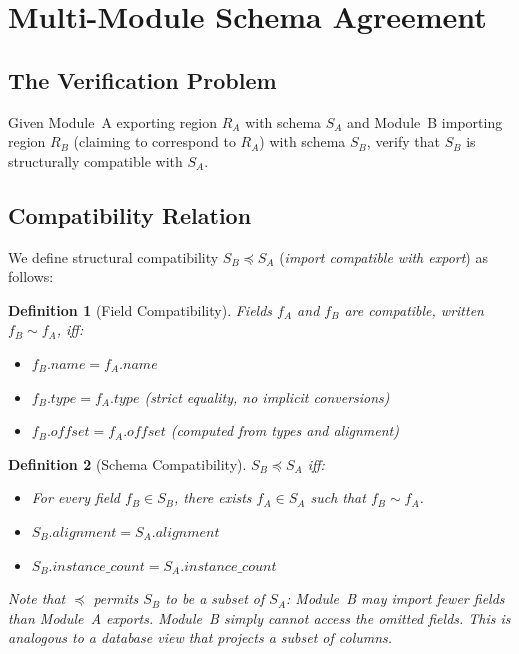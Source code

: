 \documentclass[11pt,a4paper]{article}
\newtheorem{definition}{Definition}
\begin{document}
\section{Multi-Module Schema Agreement}
\label{sec:multimodule}

\subsection{The Verification Problem}
\label{sec:verification}

Given Module~A exporting region $R_A$ with schema $S_A$ and Module~B
importing region $R_B$ (claiming to correspond to $R_A$) with schema
$S_B$, verify that $S_B$ is structurally compatible with $S_A$.

\subsection{Compatibility Relation}
\label{sec:compatibility}

We define structural compatibility $S_B \preceq S_A$ (\emph{import
compatible with export}) as follows:

\begin{definition}[Field Compatibility]
\label{def:fieldcompat}
Fields $f_A$ and $f_B$ are compatible, written $f_B \sim f_A$, iff:
\begin{itemize}
  \item $f_B.\mathit{name} = f_A.\mathit{name}$
  \item $f_B.\mathit{type} = f_A.\mathit{type}$ (strict equality, no
    implicit conversions)
  \item $f_B.\mathit{offset} = f_A.\mathit{offset}$ (computed from types
    and alignment)
\end{itemize}
\end{definition}

\begin{definition}[Schema Compatibility]
\label{def:schemacompat}
$S_B \preceq S_A$ iff:
\begin{itemize}
  \item For every field $f_B \in S_B$, there exists $f_A \in S_A$ such
    that $f_B \sim f_A$.
  \item $S_B.\mathit{alignment} = S_A.\mathit{alignment}$
  \item $S_B.\mathit{instance\_count} = S_A.\mathit{instance\_count}$
\end{itemize}

Note that $\preceq$ permits $S_B$ to be a \emph{subset} of $S_A$:
Module~B may import fewer fields than Module~A exports.  Module~B simply
cannot access the omitted fields.  This is analogous to a database view
that projects a subset of columns.
\end{definition}
\end{document}
